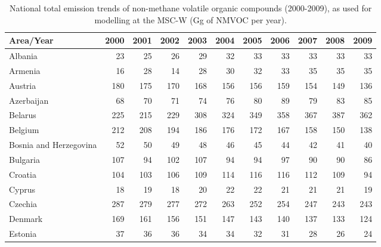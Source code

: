  
 \begin{table}
 \caption{National total emission trends of non-methane volatile organic compounds (2000-2009), as used for modelling at the MSC-W (Gg of  NMVOC per year).}
 
 \vspace{15pt}
 
 \scriptsize
 \centering
 \begin{tabular}{|l|r|r|r|r|r|r|r|r|r|r|}
 \hline
                     Area/Year&   2000&   2001&   2002&   2003&   2004&   2005&   2006&   2007&   2008&   2009\\\hline\hline
                       Albania&     23&     25&     26&     29&     32&     33&     33&     33&     33&     33\\\hline
                       Armenia&     16&     28&     14&     28&     30&     32&     33&     35&     35&     35\\\hline
                       Austria&    180&    175&    170&    168&    156&    156&    159&    154&    149&    136\\\hline
                    Azerbaijan&     68&     70&     71&     74&     76&     80&     89&     79&     83&     85\\\hline
                       Belarus&    225&    215&    229&    308&    324&    349&    358&    367&    387&    362\\\hline
                       Belgium&    212&    208&    194&    186&    176&    172&    167&    158&    150&    138\\\hline
        Bosnia and Herzegovina&     52&     50&     49&     48&     46&     45&     44&     42&     41&     40\\\hline
                      Bulgaria&    107&     94&    102&    107&     94&     94&     97&     90&     90&     86\\\hline
                       Croatia&    104&    103&    106&    109&    114&    116&    116&    112&    109&     94\\\hline
                        Cyprus&     18&     19&     18&     20&     22&     22&     21&     21&     21&     19\\\hline
                       Czechia&    287&    279&    277&    272&    263&    252&    254&    247&    243&    243\\\hline
                       Denmark&    169&    161&    156&    151&    147&    143&    140&    137&    133&    124\\\hline
                       Estonia&     37&     36&     36&     34&     34&     32&     31&     28&     26&     24\\\hline

\end{tabular}
\end{table}
